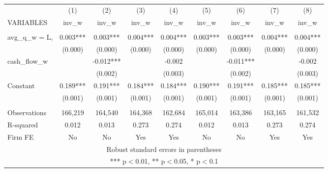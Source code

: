 \documentclass[]{article}
\begin{document}
\begin{tabular}{lcccccccc} \hline
 & (1) & (2) & (3) & (4) & (5) & (6) & (7) & (8) \\
VARIABLES & inv\_w & inv\_w & inv\_w & inv\_w & inv\_w & inv\_w & inv\_w & inv\_w \\ \hline
 &  &  &  &  &  &  &  &  \\
avg\_q\_w = L, & 0.003*** & 0.003*** & 0.004*** & 0.004*** & 0.003*** & 0.003*** & 0.004*** & 0.004*** \\
 & (0.000) & (0.000) & (0.000) & (0.000) & (0.000) & (0.000) & (0.000) & (0.000) \\
cash\_flow\_w &  & -0.012*** &  & -0.002 &  & -0.011*** &  & -0.002 \\
 &  & (0.002) &  & (0.003) &  & (0.002) &  & (0.003) \\
Constant & 0.189*** & 0.191*** & 0.184*** & 0.184*** & 0.190*** & 0.191*** & 0.185*** & 0.185*** \\
 & (0.001) & (0.001) & (0.001) & (0.001) & (0.001) & (0.001) & (0.001) & (0.001) \\
 &  &  &  &  &  &  &  &  \\
Observations & 166,219 & 164,540 & 164,368 & 162,684 & 165,014 & 163,386 & 163,165 & 161,532 \\
R-squared & 0.012 & 0.013 & 0.273 & 0.274 & 0.012 & 0.013 & 0.273 & 0.274 \\
 Firm FE & No & No & Yes & Yes & No & No & Yes & Yes \\ \hline
\multicolumn{9}{c}{ Robust standard errors in parentheses} \\
\multicolumn{9}{c}{ *** p$<$0.01, ** p$<$0.05, * p$<$0.1} \\
\end{tabular}
\end{document}
